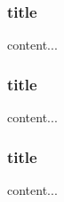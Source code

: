 \documentclass{beamer}
\newcommand{\yannis}{}
\begin{document}
{
\renewcommand{\yannis}{Mr. Duck, 2019}
\begin{frame}
\frametitle{title}
content...
\end{frame}
}

\begin{frame}
\frametitle{title}
content...
\end{frame}

{
\renewcommand{\yannis}{Clever Marmot, 2012}
\begin{frame}
\frametitle{title}
content...
\end{frame}
}
\end{document}
